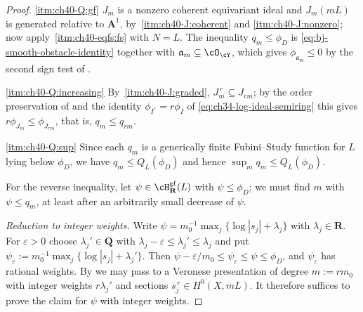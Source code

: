 \begin{proof}
\cref{itm:ch40-Q:gf}  $J_m$ is a nonzero coherent equivariant ideal and
$J_m(mL)$ is generated relative to $\mathbf A^1$, by
\,\cref{itm:ch40-J:coherent} and
\cref{itm:ch40-J:nonzero}; now apply
\,\cref{itm:ch40-eqfs:fs} with $N=L$.
The inequality $q_m\le\phi_D$ is
\eqref{eq:bj-smooth-obstacle-identity} together with
$\mathfrak a_m\subseteq\cO_{\cY}$, which gives
$\phi_{\mathfrak a_m}\le0$ by the second sign test of
.

\cref{itm:ch40-Q:increasing}  By
\,\cref{itm:ch40-J:graded},
$J_m^{\,r}\subseteq J_{rm}$; by the order preservation of
 and the identity
$\phi_{I^r}=r\phi_I$ of \eqref{eq:ch34-log-ideal-semiring} this gives
$r\phi_{J_m}\le\phi_{J_{rm}}$, that is, $q_m\le q_{rm}$.

\cref{itm:ch40-Q:sup}  Since each $q_m$ is a generically finite
Fubini--Study function for $L$ lying below $\phi_D$, we have
$q_m\le Q_L(\phi_D)$ and hence $\sup_mq_m\le Q_L(\phi_D)$.

For the reverse inequality, let $\psi\in\cH^{\mathrm{gf}}_{\mathbf R}(L)$
with $\psi\le\phi_D$; we must find $m$ with $\psi\le q_m$, at least
after an arbitrarily small decrease of $\psi$.

\emph{Reduction to integer weights.}  Write
$\psi=m_0^{-1}\max_j\{\log|s_j|+\lambda_j\}$ with $\lambda_j\in\mathbf R$.
For $\varepsilon>0$ choose $\lambda_j'\in\mathbf Q$ with
$\lambda_j-\varepsilon\le\lambda_j'\le\lambda_j$ and put
$\psi_\varepsilon:=m_0^{-1}\max_j\{\log|s_j|+\lambda_j'\}$.  Then
$\psi-\varepsilon/m_0\le\psi_\varepsilon\le\psi\le\phi_D$, and
$\psi_\varepsilon$ has rational weights.  By  we
may pass to a Veronese presentation of degree $m:=rm_0$ with integer
weights $r\lambda_j'$ and sections $s_j^{\,r}\in H^0(X,mL)$.  It
therefore suffices to prove the claim for $\psi$ with integer weights.


\end{proof}
